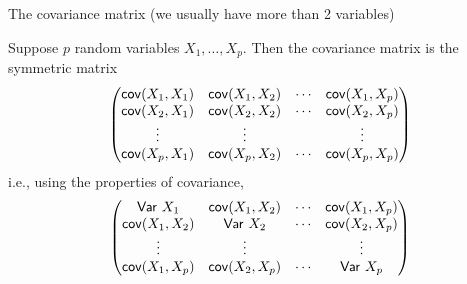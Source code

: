 \documentclass[aspectratio=169]{beamer}\usepackage[]{graphicx}\usepackage[]{xcolor}
\begin{document}
\begin{frame}{The covariance matrix (we usually have more than 2 variables)}
\begin{definition}
Suppose $p$ random variables $X_1,\ldots,X_p$. Then the covariance matrix is the symmetric matrix
\[
\begin{pmatrix}
\mathsf{cov}(X_1,X_1) & \mathsf{cov}(X_1,X_2) & \cdots & \mathsf{cov}(X_1,X_p) \\
\mathsf{cov}(X_2,X_1) & \mathsf{cov}(X_2,X_2) & \cdots & \mathsf{cov}(X_2,X_p) \\
\vdots & \vdots & & \vdots \\
\mathsf{cov}(X_p,X_1) & \mathsf{cov}(X_p,X_2) & \cdots & \mathsf{cov}(X_p,X_p) 
\end{pmatrix}
\]
i.e., using the properties of covariance,
\[
\begin{pmatrix}
\mathsf{Var}\  X_1 & \mathsf{cov}(X_1,X_2) & \cdots & \mathsf{cov}(X_1,X_p) \\
\mathsf{cov}(X_1,X_2) & \mathsf{Var}\  X_2 & \cdots & \mathsf{cov}(X_2,X_p) \\
\vdots & \vdots & & \vdots \\
\mathsf{cov}(X_1,X_p) & \mathsf{cov}(X_2,X_p) & \cdots & \mathsf{Var}\  X_p 
\end{pmatrix}
\]
\end{definition}
\end{frame}




\end{document}
